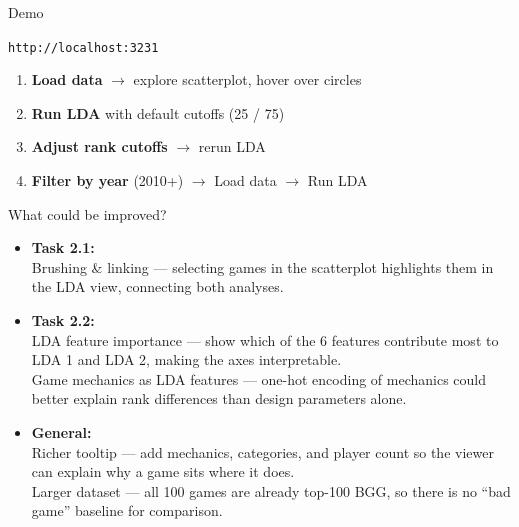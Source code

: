 \documentclass[aspectratio=169, 11pt]{beamer}
\begin{document}
\begin{frame}[t]{Demo}

\vspace{30pt}
\centering
{\large\texttt{http://localhost:3231}}

\vspace{24pt}
\begin{enumerate}\large\setlength\itemsep{10pt}
  \item \textbf{Load data} $\to$ explore scatterplot, hover over circles
  \item \textbf{Run LDA} with default cutoffs (25 / 75)
  \item \textbf{Adjust rank cutoffs} $\to$ rerun LDA
  \item \textbf{Filter by year} (2010+) $\to$ Load data $\to$ Run LDA
\end{enumerate}

\end{frame}

\begin{frame}[t]{What could be improved?}

\begin{itemize}\setlength\itemsep{10pt}
  \item \textbf{Task 2.1:}\\
        Brushing \& linking — selecting games in the scatterplot highlights them in the LDA view, connecting both analyses.

  \item \textbf{Task 2.2:}\\
        LDA feature importance — show which of the 6 features contribute most to LDA 1 and LDA 2, making the axes interpretable.\\[4pt]
        Game mechanics as LDA features — one-hot encoding of mechanics could better explain rank differences than design parameters alone.

  \item \textbf{General:}\\
        Richer tooltip — add mechanics, categories, and player count so the viewer can explain why a game sits where it does.\\[4pt]
        Larger dataset — all 100 games are already top-100 BGG, so there is no ``bad game'' baseline for comparison.
\end{itemize}

\end{frame}
\end{document}
